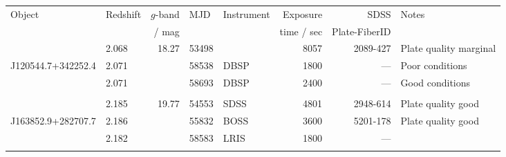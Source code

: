 \documentclass[fleqn,usenatbib]{mnras}
\begin{document}
\begin{table}
  \centering
  \begin{tabular}{l l   r ll  r r l}
    \hline 
    \hline 
    \multirow{2}{*}{Object} & \multirow{2}{*}{Redshift} & $g$-band & \multirow{2}{*}{MJD} & \multirow{3}{*}{Instrument} & Exposure      &   SDSS               & \multirow{2}{*}{Notes} \\
                                         &                                        &   / mag      &                                 &                                             &  time / sec &   Plate-FiberID  & \\
    \hline  
                                       & 2.068                              & 18.27          &  53498                   & SDSS                                     &  8057            & 2089-427             & Plate quality marginal \\
 J120544.7+342252.4     & 2.071                             &                    &  58538                   & DBSP                                     &  1800            &  ---                      &  Poor conditions \\
                                       & 2.071                             &                     &  58693                  & DBSP                                      &  2400            &  ---                      &  Good conditions        \\
                                       &                                       &                     &                               &                                              &                      &                               &                               \\
                                      & 2.185                              & 19.77           &  54553                   & SDSS                                     &   4801            &  2948-614              & Plate quality good \\
J163852.9+282707.7     & 2.186                              &                    &  55832                     & BOSS                                    &   3600            &  5201-178            & Plate quality good \\
                                      & 2.182                              &                     &  58583                     & LRIS                                    &  1800              &  ---                      & \\
                                      &                                         &                    &                                 &                                            &                      &                              &                                 \\

\end{tabular}
\end{table}
\end{document}
